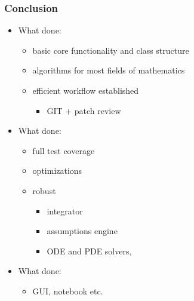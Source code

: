 \documentclass{beamer}
\begin{document}
\begin{frame}
    \frametitle{Conclusion}

    \begin{itemize}
        \item<1-> What  done:
            \begin{itemize}
                \item basic core functionality and class structure
                \item algorithms for most fields of mathematics
                \item efficient workflow established
                \begin{itemize}
                    \item GIT + patch review
                \end{itemize}
            \end{itemize}
        \item<2-> What  done:
            \begin{itemize}
                \item full test coverage
                \item optimizations
                \item robust
                \begin{itemize}
                    \item integrator
                    \item assumptions engine
                    \item ODE and PDE solvers, \structure{\ldots}
                \end{itemize}
            \end{itemize}
        \item<3-> What  done:
            \begin{itemize}
                \item GUI, notebook etc.
            \end{itemize}
    \end{itemize}
\end{frame}


%
%    
%    
\end{document}
